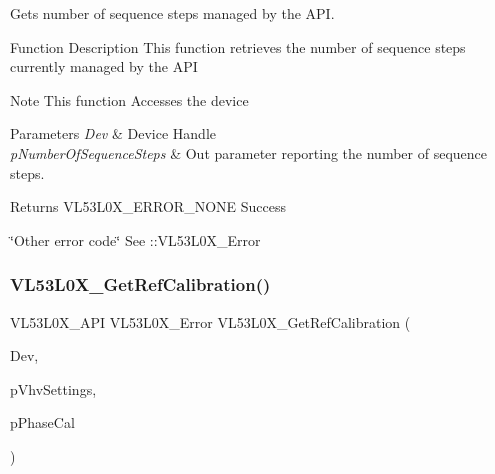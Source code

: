 Gets number of sequence steps managed by the A\+PI. 

\begin{DoxyParagraph}{Function Description}
This function retrieves the number of sequence steps currently managed by the A\+PI
\end{DoxyParagraph}
\begin{DoxyNote}{Note}
This function Accesses the device
\end{DoxyNote}

\begin{DoxyParams}{Parameters}
{\em Dev} & Device Handle \\
\hline
{\em p\+Number\+Of\+Sequence\+Steps} & Out parameter reporting the number of sequence steps. \\
\hline
\end{DoxyParams}
\begin{DoxyReturn}{Returns}
V\+L53\+L0\+X\+\_\+\+E\+R\+R\+O\+R\+\_\+\+N\+O\+NE Success 

\char`\"{}\+Other error code\char`\"{} See \+::\+V\+L53\+L0\+X\+\_\+\+Error 
\end{DoxyReturn}
\mbox{\label{group__VL53L0X__parameters__group_ga5dc1b02f59fb47477184354975f169b6}} 
\subsubsection{\texorpdfstring{V\+L53\+L0\+X\+\_\+\+Get\+Ref\+Calibration()}{VL53L0X\_GetRefCalibration()}}
{\footnotesize\ttfamily V\+L53\+L0\+X\+\_\+\+A\+PI V\+L53\+L0\+X\+\_\+\+Error V\+L53\+L0\+X\+\_\+\+Get\+Ref\+Calibration (\begin{DoxyParamCaption}\item[{\hyperlink{group__VL53L0X__platform__group_ga2d6405308b1dd524b462f1b8fb97d167}{V\+L53\+L0\+X\+\_\+\+D\+EV}}]{Dev,  }\item[{\hyperlink{vl53l0x__types_8h_aba7bc1797add20fe3efdf37ced1182c5}{uint8\+\_\+t} $\ast$}]{p\+Vhv\+Settings,  }\item[{\hyperlink{vl53l0x__types_8h_aba7bc1797add20fe3efdf37ced1182c5}{uint8\+\_\+t} $\ast$}]{p\+Phase\+Cal }\end{DoxyParamCaption})}



